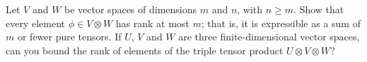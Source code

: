 \begin{problem}
  Let $V$ and $W$ be vector spaces of dimensions $m$ and $n$, with $n \geq m$. Show that every element $\phi \in V \otimes W$ has rank at most $m$; that is, it is expressible as a sum of $m$ or fewer pure tensors. If $U$, $V$ and $W$ are three finite-dimensional vector spaces, can you bound the rank of elements of the triple tensor product 
  $U \otimes V \otimes W$?
\end{problem}
